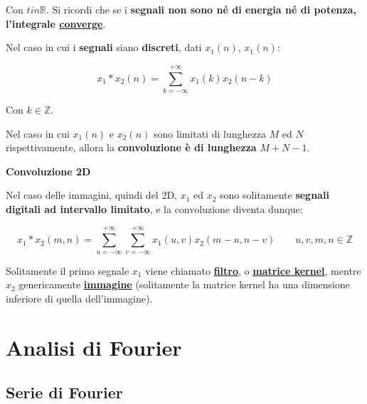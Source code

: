 \documentclass[a4paper]{article}
\begin{document}
	\noindent
	Con $t in \mathbb{R}$. Si ricordi che se i \textbf{segnali non sono né di energia né di potenza, l'integrale \underline{converge}}.\newline
	
	\noindent
	Nel caso in cui i \textbf{segnali} siano \textbf{discreti}, dati $x_{1}\left(n\right)$, $x_{1}\left(n\right)$:
	
	\begin{equation*}
		x_{1} * x_{2} \left(n\right) = \sum_{k = -\infty}^{+\infty} x_{1}\left(k\right) x_{2}\left(n - k\right)
	\end{equation*}

	\noindent
	Con $k \in \mathbb{Z}$.
	
	\noindent
	Nel caso in cui $x_{1} \left(n\right)$ e $x_{2} \left(n\right)$ sono limitati di lunghezza $M$ ed $N$ rispettivamente, allora la \textbf{convoluzione è di lunghezza} $M+N-1$.\newline
	
	\noindent
	\textcolor{Green4}{\textbf{Convoluzione 2D}}\newline
	
	\noindent
	Nel caso delle immagini, quindi del 2D, $x_{1}$ ed $x_{2}$ sono solitamente \textbf{segnali digitali ad intervallo limitato}, e la convoluzione diventa dunque:
	
	\begin{equation*}
		x_{1} * x_{2}\left(m,n\right) = \sum_{u = -\infty}^{+\infty} \sum_{v = -\infty}^{+\infty} x_{1} \left(u,v\right) x_{2}\left(m - u, n - v\right) \hspace{2em} u,v,m,n\in\mathbb{Z}
	\end{equation*}

	\noindent
	Solitamente il primo segnale $x_{1}$ viene chiamato \textbf{\underline{filtro}}, o \textbf{\underline{matrice kernel}}, mentre $x_{2}$ genericamente \textbf{\underline{immagine}} (solitamente la matrice kernel ha una dimensione inferiore di quella dell'immagine).
	
	\newpage
	
	\section{Analisi di Fourier}
	
	\subsection{Serie di Fourier}\label{serie di fourier}
	
\end{document}
